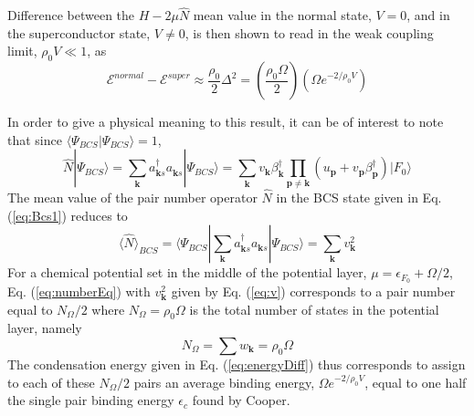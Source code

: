 \documentclass[aps,prb,preprint,groupedaddress,amsmath]{revtex4}
\newcommand{\vp}{\ensuremath{\mathbf{p}}}
\newcommand{\vk}{\ensuremath{\mathbf{k}}}
\newcommand{\dg}{\ensuremath{\dagger}}
\begin{document}
Difference between the $H-2\mu\hat{N}$ mean value in the normal state, $V=0$, and in the superconductor state, $V\neq0$, is then shown to read in the weak coupling limit, $\rho_0V\ll1$, as
\begin{equation}\label{eq:energyDiff}
\mathcal{E}^{normal}-\mathcal{E}^{super}\approx\frac{\rho_0}{2}\Delta^2=(\frac{\rho_0\Omega}{2})(\Omega{}e^{-2/\rho_0V})
\end{equation}

In order to give a physical meaning to this result, it can be of interest to note that  since $\langle\Psi_{BCS}|\Psi_{BCS}\rangle=1$, 
\begin{equation}
{\hat{N}}|\Psi_{BCS}{\rangle}=\sum_\vk{a^\dg_{\vk{}s}{}a^{}_{\vk{}s}}|\Psi_{BCS}{\rangle}
=\sum_\vk{}v_\vk\beta^\dg_\vk\prod_{\vp\neq\vk}(u_\vp+v_\vp\beta^\dg_\vp)|F_0{\rangle}
\end{equation}
The  mean value of the pair number operator $\hat{N}$ in the BCS state given in Eq. (\ref{eq:Bcs1}) reduces to
\begin{equation}\label{eq:numberEq}
\langle{\hat{N}}{\rangle}_{BCS}={\langle\Psi_{BCS}|\sum_\vk{a^\dg_{\vk{}s}{}a^{}_{\vk{}s}}|\Psi_{BCS}{\rangle}}
=\sum_\vk{v_\vk^2}
\end{equation}
For a chemical potential set in the middle of the potential layer,
 $\mu=\epsilon_{F_0}+\Omega/2$, Eq. (\ref{eq:numberEq}) with $v_\vk^2$ given by Eq. (\ref{eq:v}) corresponds to  a pair number  equal to $N_\Omega/2$ where $N_{\Omega}=\rho_0\Omega$ is the total number of states  in the potential layer, namely 
\begin{equation}
 N_\Omega=\sum{w_\vk}=\rho_0\Omega
\end{equation}
 The  condensation energy given in Eq. (\ref{eq:energyDiff}) thus corresponds to assign to each of these $N_\Omega/2$ pairs  an average binding energy, $\Omega{}e^{-2/\rho_0V}$, equal to one half the single pair binding energy $\epsilon_c$ found by Cooper. 
\end{document}
